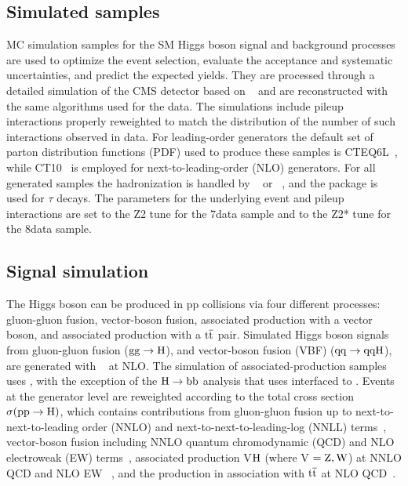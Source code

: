 \documentclass[12pt,twoside,a4paper,cmspaper,final,collab]{cms-tdr}
\begin{document}
\subsection{Simulated samples}

MC simulation samples for the SM Higgs boson signal and background processes are used
to optimize the event selection, evaluate the acceptance and systematic uncertainties, and
predict the expected yields.
They are processed through a detailed simulation of the CMS detector based on
\GEANTfour~\cite{Agostinelli:2002hh} and are reconstructed with the same algorithms used for the data.
The simulations include pileup interactions properly reweighted to match the
distribution of the number of such interactions observed in data.
For leading-order generators the default set of parton distribution functions
(PDF) used to produce these samples is CTEQ6L~\cite{CTEQ6L1}, while
CT10~\cite{Guzzi:2011sv} is employed for next-to-leading-order (NLO) generators.
For all generated samples the hadronization is handled by {} ~\cite{Sjostrand:2006za}
or \HERWIG{++}~\cite{Gieseke:2006ga}, and the \TAUOLA \cite{TAUOLA} package is used for $\tau$ decays.
The {\PYTHIA} parameters for the underlying event and pileup interactions are set to the {Z2} tune \cite{1107.0330} for the
7\TeV data sample and to the {Z2*} tune \cite{1107.0330} for the 8\TeV data sample.

\subsection{Signal simulation}

The Higgs boson can be produced in pp collisions via four different processes:
gluon-gluon fusion, vector-boson fusion, associated production with a vector boson, and associated production with
a $\mathrm{t}\overline{\mathrm{t}}$ pair.
Simulated Higgs boson signals from gluon-gluon fusion ($\mathrm{g}\mathrm{g} \rightarrow \mathrm{H}$),
and vector-boson fusion (VBF) ($\mathrm{q}\mathrm{q} \rightarrow \mathrm{q}\mathrm{q} \mathrm{H}$), are generated with
{\POWHEG}~\cite{powheg,powheg1,powheg2} at NLO.
The simulation of associated-production samples uses {\PYTHIA},
with the exception of  the  $\mathrm{H}\to\mathrm{b}\mathrm{b}$ analysis that uses {\POWHEG} interfaced to \HERWIG{++}.
Events at the generator level are reweighted according to the total cross section $\sigma(\mathrm{p}\mathrm{p}\rightarrow \mathrm{H})$,
which contains contributions from gluon-gluon fusion up to next-to-next-to-leading order (NNLO) and next-to-next-to-leading-log (NNLL) terms~\cite{LHCHiggsCrossSectionWorkingGroup:2011ti,deFlorian:2012yg,
Anastasiou:2012hx,Anastasiou:2008tj,deFlorian:2009hc,Baglio:2010ae,Djouadi:1991tka,Dawson:1990zj,Spira:1995rr,
Harlander:2002wh,Anastasiou:2002yz,Ravindran:2003um,Catani:2003zt,Actis:2008ug,Aglietti:2004nj,Degrassi:2004mx},
vector-boson fusion including NNLO quantum chromodynamic (QCD) and NLO
electroweak (EW)
terms~\cite{LHCHiggsCrossSectionWorkingGroup:2011ti,Ciccolini:2007jr,Ciccolini:2007ec,Figy:2003nv,Arnold:2008rz,Bolzoni:2010xr},
associated production V$\mathrm{H}$ (where V $= \mathrm{Z},\mathrm{W}$) at NNLO QCD and
NLO EW ~\cite{Han:1991ia,Brein:2003wg,Ciccolini:2003jy,Hamberg:1990np,Denner:2011id,Ferrera:2011bk},
and the production in association with $\mathrm{t}\overline{\mathrm{t}}$ at NLO QCD~\cite{Beenakker:2001rj,Beenakker:2002nc,Dawson:2002tg,Dawson:2003zu}.
\end{document}
